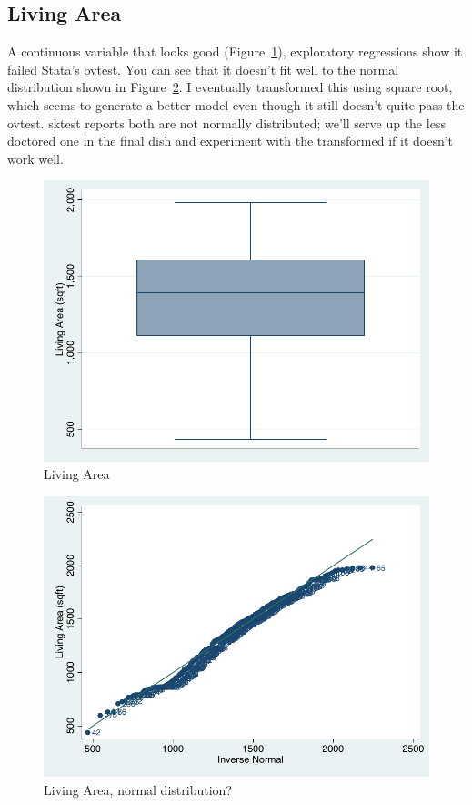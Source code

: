 \documentclass[twocolumn,11pt]{article}
\begin{document}
\subsection*{Living Area}
A continuous variable that looks good (Figure~\ref{fig:sqft-box}),
exploratory regressions show it failed Stata's ovtest.
You can see that it doesn't fit well to the normal distribution shown in Figure~\ref{fig:sqft-qnorm}.
I eventually transformed this using square root,
which seems to generate a better model even though it still doesn't quite pass the ovtest.
sktest reports both are not normally distributed;
we'll serve up the less doctored one in the final dish and experiment with the transformed if it doesn't work well.
\begin{figure}[H]
\centering
  \includegraphics[width=.9\linewidth]{figures/sqft-box}
  \caption{Living Area}
  \label{fig:sqft-box}
\end{figure}
\begin{figure}[H]
\centering
  \includegraphics[width=.9\linewidth]{figures/sqft-qnorm.pdf}
  \caption{Living Area, normal distribution?}
  \label{fig:sqft-qnorm}
\end{figure}
\end{document}
